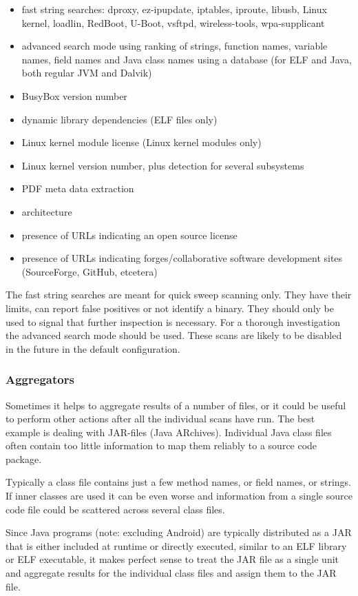 \documentclass[10pt]{article}
\begin{document}
\begin{itemize}
\item fast string searches: dproxy, ez-ipupdate, iptables, iproute, libusb,
Linux kernel, loadlin, RedBoot, U-Boot, vsftpd, wireless-tools, wpa-supplicant
\item advanced search mode using ranking of strings, function names, variable
names, field names and Java class names using a database (for ELF and Java,
both regular JVM and Dalvik)
\item BusyBox version number
\item dynamic library dependencies (ELF files only)
\item Linux kernel module license (Linux kernel modules only)
\item Linux kernel version number, plus detection for several subsystems
\item PDF meta data extraction
\item architecture
\item presence of URLs indicating an open source license
\item presence of URLs indicating forges/collaborative software development
sites (SourceForge, GitHub, etcetera)
\end{itemize}

The fast string searches are meant for quick sweep scanning only. They have
their limits, can report false positives or not identify a binary. They should
only be used to signal that further inspection is necessary. For a thorough
investigation the advanced search mode should be used. These scans are likely
to be disabled in the future in the default configuration.

\subsubsection{Aggregators}

Sometimes it helps to aggregate results of a number of files, or it could be
useful to perform other actions after all the individual scans have run. The
best example is dealing with JAR-files (Java ARchives). Individual Java class
files often contain too little information to map them reliably to a source
code package.

Typically a class file contains just a few method names, or field names, or
strings. If inner classes are used it can be even worse and information from a
single source code file could be scattered across several class files.

Since Java programs (note: excluding Android) are typically distributed as a
JAR that is either included at runtime or directly executed, similar to an ELF
library or ELF executable, it makes perfect sense to treat the JAR file as a
single unit and aggregate results for the individual class files and assign
them to the JAR file.
\end{document}
